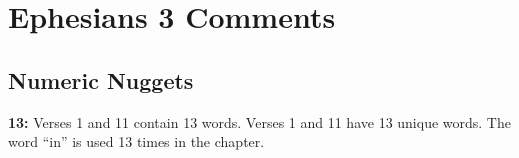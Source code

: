 \section{Ephesians 3 Comments}

\subsection{Numeric Nuggets}
\textbf{13:} Verses 1 and 11 contain 13 words. Verses 1 and 11 have 13 unique words. The word ``in'' is used 13 times in the chapter.